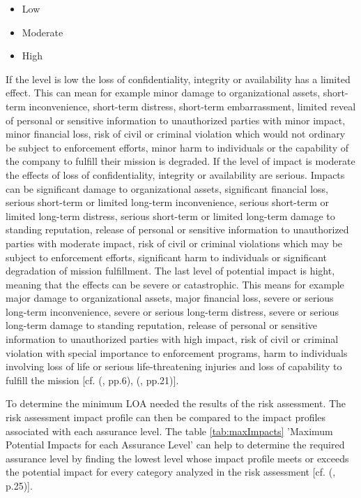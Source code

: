\begin{itemize}
	\item Low
	\item Moderate
	\item High
\end{itemize}


If the level is low the loss of confidentiality, integrity or availability has a limited effect. This can mean for example minor damage to organizational assets, short-term inconvenience, short-term distress, short-term embarrassment, limited reveal of personal or sensitive information to unauthorized parties with minor impact, minor financial loss, risk of civil or criminal violation which would not ordinary be subject to enforcement efforts, minor harm to individuals or the capability of the company to fulfill their mission is degraded. If the level of impact is moderate the effects of loss of confidentiality, integrity or availability are serious. Impacts can be significant damage to organizational assets, significant financial loss, serious short-term or limited long-term inconvenience,  serious short-term or limited long-term distress,  serious short-term or limited long-term damage to standing reputation, release of personal or sensitive information to unauthorized parties with moderate impact, risk of civil or criminal violations which may be subject to enforcement efforts, significant harm to individuals or significant degradation of mission fulfillment. The last level of potential impact is hight, meaning that the effects can be severe or catastrophic. This means for example major damage to organizational assets, major financial loss, severe or serious long-term inconvenience, severe or serious long-term distress, severe or serious long-term damage to standing reputation, release of personal or sensitive information to unauthorized parties with high impact, risk of civil or criminal violation with special importance to enforcement programs, harm to individuals involving loss of life or serious life-threatening injuries and loss of capability to fulfill the mission [cf. (\cite{NIST:2004:FIOPS}, pp.6), (\cite{NIST:2017:DIG}, pp.21)].


To determine the minimum LOA needed the results of the risk assessment. The risk assessment impact profile can then be compared to the impact profiles associated with each assurance level. The table \ref{tab:maxImpacts} 'Maximum Potential Impacts for each Assurance Level' can help to determine the required assurance level by finding the lowest level whose impact profile meets or exceeds the potential impact for every category analyzed in the risk assessment [cf. (\cite{NIST:2017:DIG}, p.25)].

